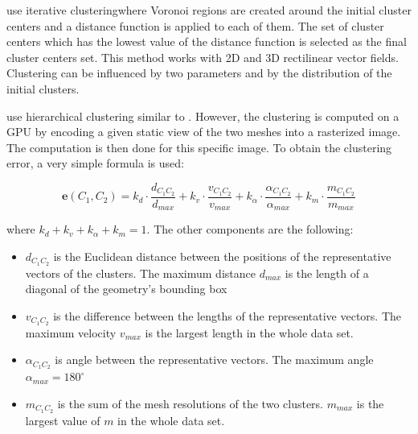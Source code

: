 \citet{Du04} use iterative clustering\footnotemark where Voronoi regions are created around the initial cluster centers and a distance function is applied to each of them. The set of cluster centers which has the lowest value of the distance function is selected as the final cluster centers set. This method works with 2D and 3D rectilinear vector fields. Clustering can be influenced by two parameters and by the distribution of the initial clusters.


\citet{Peng12} use hierarchical clustering similar to \citet{Telea99}. However, the clustering is computed on a GPU by encoding a given static view of the two meshes into a rasterized image. The computation is then done for this specific image. To obtain the clustering error, a very simple formula is used:

\begin{equation} \label{eq:clustering_error}
\bm{e}(C_1,C_2) = k_d \cdot \frac{d_{C_1C_2}}{d_{max}} + k_v \cdot \frac{v_{C_1C_2}}{v_{max}} + k_\alpha \cdot \frac{\alpha_{C_1C_2}}{\alpha_{max}} + k_m \cdot \frac{m_{C_1C_2}}{m_{max}}
\end{equation}

where \(k_d + k_v + k_\alpha + k_m = 1\). The other components are the following:

\begin{itemize}
\item \(d_{C_1C_2}\) is the Euclidean distance between the positions of the representative vectors of the clusters. The maximum distance \(d_{max}\) is the length of a diagonal of the geometry's bounding box
\item \(v_{C_1C_2}\) is the difference between the lengths of the representative vectors. The maximum velocity \(v_{max}\) is the largest length in the whole data set.
\item \(\alpha_{C_1C_2}\) is angle between the representative vectors. The maximum angle \(\alpha_{max} = 180^\circ\)
\item \(m_{C_1C_2}\) is the sum of the mesh resolutions of the two clusters. \(m_{max}\) is the largest value of \(m\) in the whole data set.
\end{itemize}

